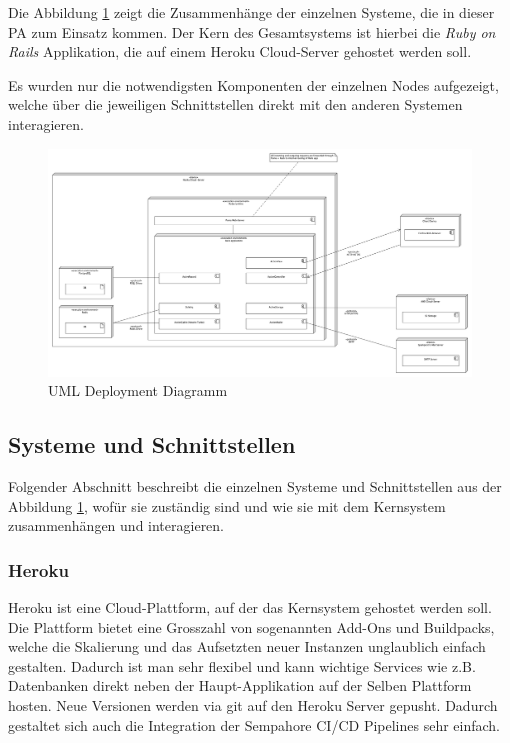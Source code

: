 Die Abbildung \ref{fig:deployment} zeigt die Zusammenhänge der einzelnen Systeme, die in dieser PA zum Einsatz kommen.
Der Kern des Gesamtsystems ist hierbei die \emph{Ruby on Rails} Applikation, die auf einem Heroku Cloud-Server gehostet werden soll.

Es wurden nur die notwendigsten Komponenten der einzelnen Nodes aufgezeigt, welche über die jeweiligen Schnittstellen direkt mit den anderen Systemen interagieren.

\begin{figure}[H]
    \centering
    \includegraphics[width=\textwidth]{images/diagrams/deployment.png}
    \caption{\label{fig:deployment}UML Deployment Diagramm}
\end{figure}

\subsection{Systeme und Schnittstellen}

Folgender Abschnitt beschreibt die einzelnen Systeme und Schnittstellen aus der Abbildung \ref{fig:deployment},
wofür sie zuständig sind und wie sie mit dem Kernsystem zusammenhängen und interagieren.

\subsubsection{Heroku}
Heroku ist eine Cloud-Plattform, auf der das Kernsystem gehostet werden soll. Die Plattform bietet eine
Grosszahl von sogenannten Add-Ons und Buildpacks, welche die Skalierung und das Aufsetzten neuer Instanzen unglaublich einfach gestalten.
Dadurch ist man sehr flexibel und kann wichtige Services wie z.B. Datenbanken direkt neben der Haupt-Applikation auf der Selben Plattform hosten.
Neue Versionen werden via git auf den Heroku Server gepusht. Dadurch gestaltet sich auch die Integration der Sempahore CI/CD Pipelines sehr einfach.

